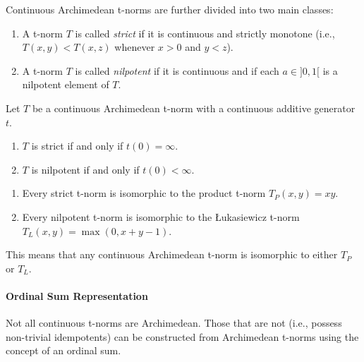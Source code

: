 Continuous Archimedean t-norms are further divided into two main classes:

\begin{definition}
  \begin{enumerate}
      \item A t-norm $T$ is called \emph{strict} if it is continuous and strictly monotone (i.e., $T(x,y) < T(x,z)$ whenever $x>0$ and $y<z$).
      \item A t-norm $T$ is called \emph{nilpotent} if it is continuous and if each $a \in ]0,1[$ is a nilpotent element of $T$.
  \end{enumerate}
\end{definition}

\begin{corollary}
  Let $T$ be a continuous Archimedean t-norm with a continuous additive generator $t$.
  \begin{enumerate}
      \item $T$ is strict if and only if $t(0) = \infty$.
      \item $T$ is nilpotent if and only if $t(0) < \infty$.
  \end{enumerate}
\end{corollary}

\begin{proposition}
  \begin{enumerate}
      \item Every strict t-norm is isomorphic to the product t-norm $T_P(x,y) = xy$.
      \item Every nilpotent t-norm is isomorphic to the Łukasiewicz t-norm $T_L(x,y) = \max(0, x+y-1)$.
  \end{enumerate}
  This means that any continuous Archimedean t-norm is isomorphic to either $T_P$ or $T_L$.
\end{proposition}

\paragraph{Ordinal Sum Representation}
Not all continuous t-norms are Archimedean. Those that are not (i.e., possess non-trivial idempotents) can be constructed from Archimedean t-norms using the concept of an ordinal sum.

